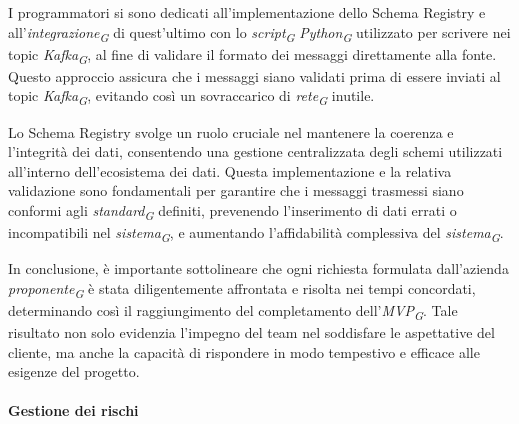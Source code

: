 I programmatori si sono dedicati all'implementazione dello Schema Registry e all'\textit{integrazione}\textsubscript{\textit{G}} di quest’ultimo con lo \textit{script}\textsubscript{\textit{G}} \textit{Python}\textsubscript{\textit{G}} utilizzato per scrivere nei topic \textit{Kafka}\textsubscript{\textit{G}}, al fine di validare il formato dei messaggi direttamente alla fonte. Questo approccio assicura che i messaggi siano validati prima di essere inviati al topic \textit{Kafka}\textsubscript{\textit{G}}, evitando così un sovraccarico di \textit{rete}\textsubscript{\textit{G}} inutile.

Lo Schema Registry svolge un ruolo cruciale nel mantenere la coerenza e l'integrità dei dati, consentendo una gestione centralizzata degli schemi utilizzati all'interno dell'ecosistema dei dati. Questa implementazione e la relativa validazione sono fondamentali per garantire che i messaggi trasmessi siano conformi agli \textit{standard}\textsubscript{\textit{G}} definiti, prevenendo l'inserimento di dati errati o incompatibili nel \textit{sistema}\textsubscript{\textit{G}}, e aumentando l'affidabilità complessiva del \textit{sistema}\textsubscript{\textit{G}}.

In conclusione, è importante sottolineare che ogni richiesta formulata dall’azienda \textit{proponente}\textsubscript{\textit{G}} è stata diligentemente affrontata e risolta nei tempi concordati, determinando così il raggiungimento del completamento dell'\textit{MVP}\textsubscript{\textit{G}}. Tale risultato non solo evidenzia l’impegno del team nel soddisfare le aspettative del cliente, ma anche la capacità di rispondere in modo tempestivo e efficace alle esigenze del progetto.


\paragraph{Gestione dei rischi}

